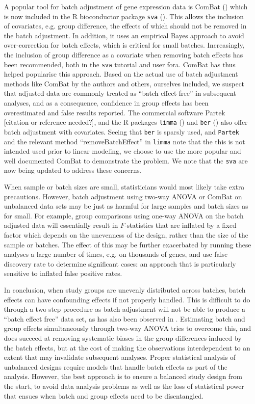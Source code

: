 \documentclass{bio}
\newcommand\CITE[1]{\textcolor{CITEcol}{[#1]}}
\begin{document}
A popular tool for batch adjustment of gene expression data is ComBat (\citealp{Johnson2007}) which is now included in the R bioconductor package \texttt{sva} (\citealp{Leek2012}). This allows the inclusion of covariates, e.g. group difference, the effects of which should not be removed in the batch adjustment. In addition, it uses an empirical Bayes approach to avoid over-correction for batch effects, which is critical for small batches. Increasingly, the inclusion of group difference as a covariate when removing batch effects has been recommended, both in the \texttt{sva} tutorial and user fora. ComBat has thus helped popularise this approach. Based on the actual use of batch adjustment methods like ComBat by the authors and others, ourselves included, we suspect that adjusted data are commonly treated as ``batch effect free'' in subsequent analyses, and as a consequence, confidence in group effects has been overestimated and false results reported. The commercial software Partek \CITE{citation or reference needed?}, and the R packages \texttt{limma} (\citealp{Smyth2003}) and \texttt{ber} (\citealp{Giordan2013}) also offer batch adjustment with covariates. Seeing that \texttt{ber} is sparsly used, and \texttt{Partek} and the relevant method ``removeBatchEffect'' in \texttt{limma} note that the this is not intended used prior to linear modeling, we choose to use the more popular and well documented ComBat to demonstrate the problem. We note that the \texttt{sva} are now being updated to address these concerns.

When sample or batch sizes are small, statisticians would most likely take extra precautions. However, batch adjustment using two-way ANOVA or ComBat on unbalanced data sets may be just as harmful for large samples and batch sizes as for small. For example, group comparisons using one-way ANOVA on the batch adjusted data will essentially result in $F$-statistics that are inflated by a fixed factor which depends on the unevenness of the design, rather than the size of the sample or batches. The effect of this may be further exacerbated by running these analyses a large number of times, e.g. on thousands of genes, and use false discovery rate to determine significant cases: an approach that is particularly sensitive to inflated false positive rates.

In conclusion, when study groups are unevenly distributed across batches, batch effects can have confounding effects if not properly handled. This is difficult to do through a two-step procedure as batch adjustment will not be able to produce a ``batch effect free'' data set, as has also been observed in \citet{Buhule2014}. Estimating batch and group effects simultaneously through two-way ANOVA tries to overcome this, and does succeed at removing systematic biases in the group differences induced by the batch effects, but at the cost of making the observations interdependent to an extent that may invalidate subsequent analyses. Proper statistical analysis of unbalanced designs require models that handle batch effects as part of the analysis. However, the best approach is to ensure a balanced study design from the start, to avoid data analysis problems as well as the loss of statistical power that ensues when batch and group effects need to be disentangled.
\end{document}
